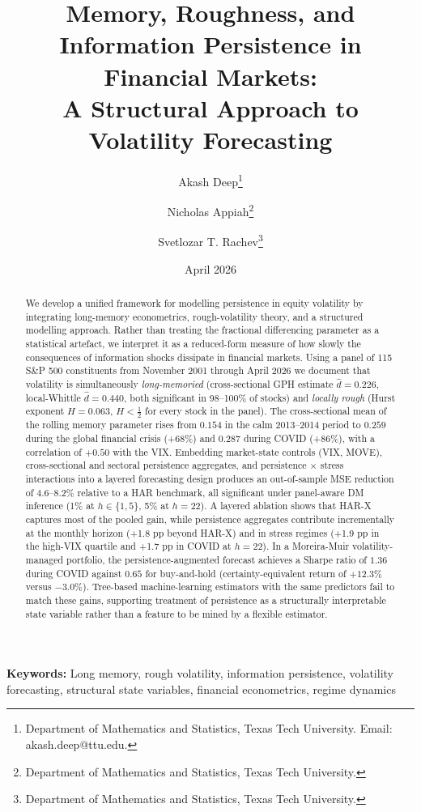\documentclass[11pt,a4paper]{article}
\title{\textbf{Memory, Roughness, and Information Persistence in Financial
Markets:\\[3pt] A Structural Approach to Volatility Forecasting}}
\author{
Akash Deep\thanks{Department of Mathematics and Statistics, Texas Tech
University. Email: akash.deep@ttu.edu.} \and
Nicholas Appiah\thanks{Department of Mathematics and Statistics, Texas
Tech University.} \and
Svetlozar T. Rachev\thanks{Department of Mathematics and Statistics, Texas
Tech University.}
}
\date{April 2026}
\newcommand{\dhat}{\hat d}
\begin{document}
\maketitle

\begin{abstract}
\noindent We develop a unified framework for modelling persistence in equity
volatility by integrating long-memory econometrics, rough-volatility theory,
and a structured modelling approach. Rather than treating the fractional
differencing parameter as a statistical artefact, we interpret it as a
reduced-form measure of how slowly the consequences of information shocks
dissipate in financial markets. Using a panel of 115 S\&P 500 constituents
from November 2001 through April 2026 we document that volatility is
simultaneously \emph{long-memoried} (cross-sectional GPH estimate
$\dhat = 0.226$, local-Whittle $\dhat = 0.440$, both significant in
98--100\% of stocks) and \emph{locally rough} (Hurst exponent $H = 0.063$,
$H<\tfrac12$ for every stock in the panel). The cross-sectional mean of the
rolling memory parameter rises from $0.154$ in the calm 2013--2014 period to
$0.259$ during the global financial crisis (+68\%) and $0.287$ during COVID
(+86\%), with a correlation of $+0.50$ with the VIX. Embedding market-state
controls (VIX, MOVE), cross-sectional and sectoral persistence aggregates,
and persistence $\times$ stress interactions into a layered forecasting
design produces an out-of-sample MSE reduction of 4.6--8.2\% relative to a
HAR benchmark, all significant under panel-aware DM inference (1\% at
$h\in\{1,5\}$, 5\% at $h=22$). A layered ablation shows that HAR-X
captures most of the pooled gain, while persistence aggregates contribute
incrementally at the monthly horizon (+1.8 pp beyond HAR-X) and in stress
regimes (+1.9 pp in the high-VIX quartile and +1.7 pp in COVID at $h=22$).
In a Moreira-Muir volatility-managed portfolio, the persistence-augmented
forecast achieves a Sharpe ratio of $1.36$ during COVID against $0.65$
for buy-and-hold (certainty-equivalent return of $+12.3\%$ versus
$-3.0\%$). Tree-based machine-learning estimators with the same predictors
fail to match these gains, supporting treatment of persistence as a
structurally interpretable state variable rather than a feature to be
mined by a flexible estimator.
\end{abstract}

\noindent\textbf{Keywords:} Long memory, rough volatility, information persistence, volatility forecasting, structural state variables, financial econometrics, regime dynamics
\end{document}
